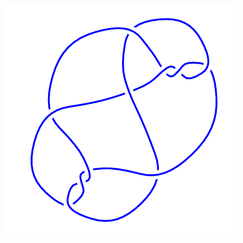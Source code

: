 \begin{figure}[H]
\begin{minipage}[b]{.18\linewidth}
	\end{minipage}
	\begin{minipage}[b]{.18\linewidth}
		\centering
		\includegraphics[width=\linewidth]{../data/10_26.png}
	\end{minipage}
\end{figure}
